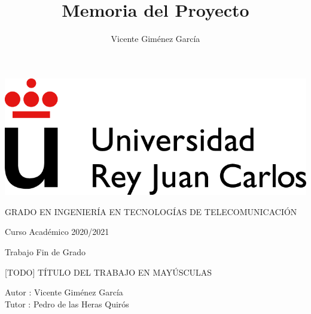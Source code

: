 \documentclass[a4paper, 12pt]{book}
\title{Memoria del Proyecto}
\author{Vicente Giménez García}
\begin{document}
    \renewcommand{\refname}{Bibliografía}  %
    \renewcommand{\appendixname}{Apéndice}


    \begin{titlepage}
        \begin{center}
            \includegraphics[scale=0.8]{img/URJ_logo_Color_POS.png}

            \vspace{1.75cm}

            \Large
            GRADO EN INGENIERÍA EN TECNOLOGÍAS DE TELECOMUNICACIÓN

            \vspace{0.4cm}

            \large
            Curso Académico 2020/2021

            \vspace{0.8cm}

            Trabajo Fin de Grado

            \vspace{2.5cm}

            \LARGE
            [TODO] TÍTULO DEL TRABAJO EN MAYÚSCULAS

            \vspace{4cm}

            \large
            Autor : Vicente Giménez García \\
            Tutor : Pedro de las Heras Quirós
        \end{center}
    \end{titlepage}

    \newpage
    \mbox{}
    \thispagestyle{empty} %


    \clearpage
    \chapter*{}
\end{document}
